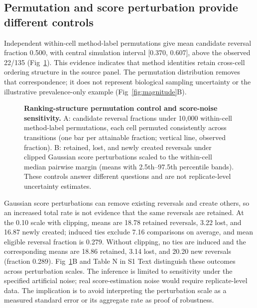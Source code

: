 \documentclass[10pt,letterpaper]{article}
\begin{document}
\subsection*{Permutation and score perturbation provide different controls}
Independent within-cell method-label permutations give mean candidate reversal fraction 0.500, with central simulation interval [0.370, 0.607], above the observed 22/135 (Fig~\ref{fig:nulls}). This evidence indicates that method identities retain cross-cell ordering structure in the source panel. The permutation distribution removes that correspondence; it does not represent biological sampling uncertainty or the illustrative prevalence-only example (Fig~\ref{fig:magnitude}B).

\begin{figure}[!ht]
\caption{{\bf Ranking-structure permutation control and score-noise sensitivity.} A: candidate reversal fractions under 10{,}000 within-cell method-label permutations, each cell permuted consistently across transitions (one bar per attainable fraction; vertical line, observed fraction). B: retained, lost, and newly created reversals under clipped Gaussian score perturbations scaled to the within-cell median pairwise margin (means with 2.5th--97.5th percentile bands). These controls answer different questions and are not replicate-level uncertainty estimates.}
\label{fig:nulls}
\end{figure}

Gaussian score perturbations can remove existing reversals and create others, so an increased total rate is not evidence that the same reversals are retained. At the 0.10 scale with clipping, means are 18.78 retained reversals, 3.22 lost, and 16.87 newly created; induced ties exclude 7.16 comparisons on average, and mean eligible reversal fraction is 0.279. Without clipping, no ties are induced and the corresponding means are 18.86 retained, 3.14 lost, and 20.20 new reversals (fraction 0.289). Fig~\ref{fig:nulls}B and Table N in S1 Text distinguish these outcomes across perturbation scales. The inference is limited to sensitivity under the specified artificial noise; real score-estimation noise would require replicate-level data. The implication is to avoid interpreting the perturbation scale as a measured standard error or its aggregate rate as proof of robustness.
\end{document}
